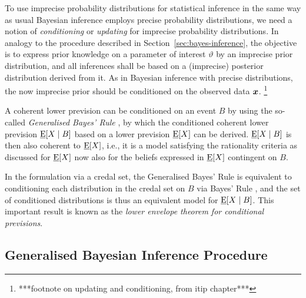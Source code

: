To use imprecise probability distributions for statistical inference
in the same way as usual Bayesian inference employs precise probability distributions,
we need a notion of \emph{conditioning} or \emph{updating} for imprecise probability distributions.
In analogy to the procedure described in Section~\ref{sec:bayes-inference},
the objective is to express prior knowledge on a parameter of interest $\vartheta$
by an imprecise prior distribution,
and all inferences shall be based on a (imprecise) posterior distribution derived from it.
As in Bayesian inference with precise distributions,
the now imprecise prior should be conditioned on the observed data ${\bm x}$.%
\footnote{\label{foot:updating}***footnote on updating and conditioning, from itip chapter***}

A coherent lower prevision can be conditioned on an event $B$
by using the so-called \emph{Generalised Bayes' Rule} \parencite[\S 6.4]{1991:walley},
by which the conditioned coherent lower prevision $\underline{\operatorname{E}}[X\mid B]$
based on a lower prevision $\underline{\operatorname{E}}[X]$ can be derived.
$\underline{\operatorname{E}}[X\mid B]$ is then also coherent to $\underline{\operatorname{E}}[X]$, i.e.,
it is a model satisfying the rationality criteria as discussed for $\underline{\operatorname{E}}[X]$
now also for the beliefs expressed in $\underline{\operatorname{E}}[X]$ contingent on $B$.

In the formulation via a credal set, the Generalised Bayes' Rule
is equivalent to conditioning each distribution in the credal set on $B$ via Bayes' Rule
\parencite[\S 6.4.2]{1991:walley},
and the set of conditioned distributions is thus an equivalent model for $\underline{\operatorname{E}}[X\mid B]$.
This important result is known as the \emph{lower envelope theorem for conditional previsions}.


\subsection{Generalised Bayesian Inference Procedure}
\label{sec:imprecisebayes}



